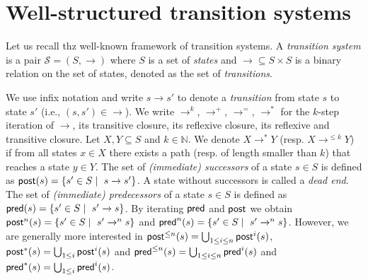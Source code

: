 


\section{Well-structured transition systems}\label{section definitions}







\noindent
Let us recall thz well-known framework of transition systems. 
 A {\em transition system} is a pair $\mathscr{S} = (S,\rightarrow )$ where $S$ is a set of 
 {\em states} and  
 $ {\rightarrow} \subseteq S \times S$ is a
 binary relation 
 on
 the set of states, denoted as the set of {\em transitions}. 
%
\iffalse
\mathieu{ Maybe add this back ?
A {\em labeled transition system} (LTS for short) is a tuple $\mathscr{S}=(S, \Sigma, \rightarrow)$ where 
$S$ is a set of {\em states}, $\Sigma$ is a (finite) set of {\em labels}, and 
${\rightarrow} \subseteq S\times \Sigma \times S$ is a 
ternary relation,
denoted as the set of {\em labeled transitions}. }
\fi
%
We use infix notation and write $s \rightarrow s'$ to denote a {\em transition} from state $s$ to state $s'$ (i.e., $ (s,s') \in  {\rightarrow} $).
We write $\rightarrow^{k}$, $\rightarrow^{+}$, $\rightarrow^{=}$, $\rightarrow^{*}$
for the $k$-step iteration of $\rightarrow$, its transitive closure, its reflexive closure, its reflexive and transitive closure.
Let $X,Y \subseteq S$ and $k \in \mathbb{N}$. We denote $X \longrightarrow^{*} Y$ (resp. $X \longrightarrow^{\leq k} Y$) if from all states $x \in X$ there exists a path (resp. of length smaller than $k$) that reaches a state $y \in Y$.
\noindent
The set of {\em (immediate) successors} of a state $s \in S$ is defined as 
 $\textsf{post}(s) = \{ s' \in S \mid  ~ s \xrightarrow{} s'\}$. 
A state without successors is called a {\em dead end}. 
The set of {\em (immediate) predecessors} of a state $s \in S$ is deﬁned as
 $\textsf{pred}(s) = \{ s' \in S \mid  ~ s' \xrightarrow{} s\}$. 
By iterating $\textsf{pred}$ and $\textsf{post}$ we obtain  
$\textsf{post}^n(s) = \{ s' \in S \mid  ~ s' \xrightarrow{}^n s\}$
and
$\textsf{pred}^n(s) = \{ s' \in S \mid  ~ s' \xrightarrow{}^n s\}$.
However, we are generally more interested in
$\textsf{post}^{\leq n}(s) = \bigcup_{1 \leq i \leq n} \textsf{post}^i(s)$, $\textsf{post}^*(s)= \bigcup_{1 \leq i} \textsf{post}^i(s)$
and
$\textsf{pred}^{\leq n}(s) = \bigcup_{1 \leq i \leq n} \textsf{pred}^i(s)$ and $\textsf{pred}^*(s) = \bigcup_{1 \leq i} \textsf{pred}^i(s)$. %


